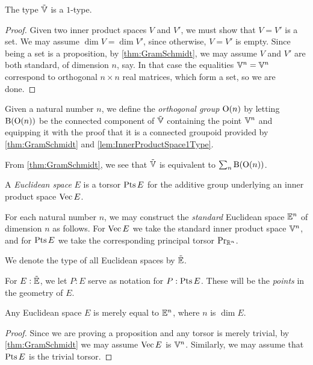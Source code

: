 \begin{lemma}\label{lem:InnerProductSpace1Type}
  The type ${\tilde {\mathbb V}}$ is a $1$-type.
\end{lemma}

\begin{proof}
  Given two inner product spaces $V$ and $V'$, we must show that $V=V'$ is a
  set.  We may assume $\dim V = \dim V'$, since otherwise, $V=V'$ is empty.
  Since being a set is a proposition, by \cref{thm:GramSchmidt}, we may assume
  $V$ and $V'$ are both standard, of dimension $n$, say.  In that case the
  equalities $\mathbb V^n = \mathbb V^n$ correspond to orthogonal $n \times n$ real
  matrices, which form a set, so we are done.
\end{proof}

\begin{definition}\label{def:OrthogonalGroup}
  Given a natural number $n$, we define the {\em orthogonal group} $\mathrm O(n)$
  by letting $\mathrm B (\mathrm O(n))$ be the connected component of ${\tilde {\mathbb V}}$ containing
  the point $\mathbb V^n$ and equipping it with the proof that it is a connected
  groupoid provided by \cref{thm:GramSchmidt} and
  \cref{lem:InnerProductSpace1Type}.
\end{definition}

From \cref{thm:GramSchmidt}, we see that ${\tilde {\mathbb V}}$ is equivalent to 
$\sum_n \mathrm B (\mathrm O(n))$.

\begin{definition}\label{def:EuclideanSpace}
  A {\em Euclidean space} $E$ is a torsor $\operatorname{Pts} E$ for the additive group
  underlying an inner product space $\operatorname{Vec} E$.
\end{definition}

For each natural number $n$, we may construct the {\em standard} Euclidean
space $\mathbb E^n$ of dimension $n$ as follows.  For $\operatorname{Vec} E$ we take the
standard inner product space $\mathbb V^n$, and for $\operatorname{Pts} E$ we take the
corresponding principal torsor $\mathrm{Pr}_{{\mathbb{R}^n}}$.

We denote the type of all Euclidean spaces by ${\tilde {\mathbb E}}$.

For $E:{\tilde {\mathbb E}}$, we let $P:E$ serve as notation for $P:\operatorname{Pts} E$.  These will be
the {\em points} in the geometry of $E$.

\begin{theorem}\label{thm:EuclideanNormalization}
  Any Euclidean space $E$ is merely equal to $\mathbb E^n$, where $n$ is $\dim E$.
\end{theorem}

\begin{proof}
  Since we are proving a proposition and any torsor is merely trivial, by
  \cref{thm:GramSchmidt} we may assume $\operatorname{Vec} E$ is $\mathbb V^n$.  Similarly, we
  may assume that $\operatorname{Pts} E$ is the trivial torsor.
\end{proof}

